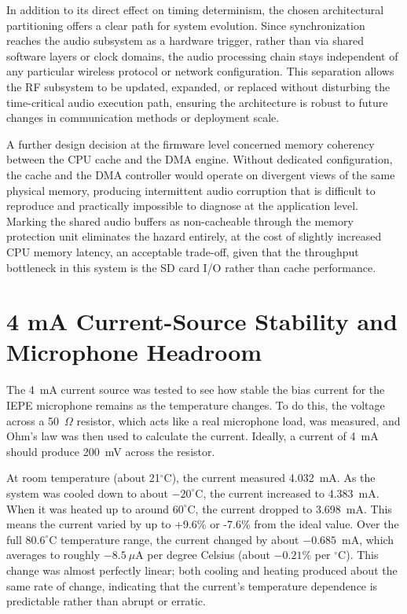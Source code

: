 In addition to its direct effect on timing determinism, the chosen architectural partitioning offers a clear path for system evolution. Since synchronization reaches the audio subsystem as a hardware trigger, rather than via shared software layers or clock domains, the audio processing chain stays independent of any particular wireless protocol or network configuration. This separation allows the RF subsystem to be updated, expanded, or replaced without disturbing the time-critical audio execution path, ensuring the architecture is robust to future changes in communication methods or deployment scale.

A further design decision at the firmware level concerned memory coherency between the CPU cache and the DMA engine. Without dedicated configuration, the cache and the DMA controller would operate on divergent views of the same physical memory, producing intermittent audio corruption that is difficult to reproduce and practically impossible to diagnose at the application level. Marking the shared audio buffers as non-cacheable through the memory protection unit eliminates the hazard entirely, at the cost of slightly increased CPU memory latency, an acceptable trade-off, given that the throughput bottleneck in this system is the SD card I/O rather than cache performance.

\section{4 mA Current-Source Stability and Microphone Headroom}
The 4~mA current source was tested to see how stable the bias current for the IEPE microphone remains as the temperature changes. To do this, the voltage across a 50~$\Omega$ resistor, which acts like a real microphone load, was measured, and Ohm’s law was then used to calculate the current. Ideally, a current of 4~mA should produce 200~mV across the resistor.

At room temperature (about 21$^\circ$C), the current measured 4.032~mA. As the system was cooled down to about $-20^\circ$C, the current increased to 4.383~mA. When it was heated up to around $60^\circ$C, the current dropped to 3.698~mA. This means the current varied by up to +9.6\% or -7.6\% from the ideal value. Over the full $80.6^\circ$C temperature range, the current changed by about $-0.685$~mA, which averages to roughly $-8.5~\mu$A per degree Celsius (about $-0.21\%$ per $^\circ$C). This change was almost perfectly linear; both cooling and heating produced about the same rate of change, indicating that the current’s temperature dependence is predictable rather than abrupt or erratic.

